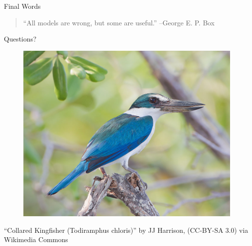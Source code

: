 \documentclass{beamer}
\begin{document}
\begin{frame}{Final Words}
\begin{quote}
``All models are wrong, but some are useful.'' --George E. P. Box
\end{quote}


\end{frame}




\begin{frame}{Questions? }
	\begin{figure}
		\centering
		\includegraphics[height=.80\textheight]{../images/kingfisher.jpg}
	\end{figure}
	\tiny
	\begin{center}\color{OSUdkbrn}
	``Collared Kingfisher (Todiramphus chloris)'' by JJ Harrison, (CC-BY-SA 3.0) via  Wikimedia Commons
	\end{center}

\end{frame}
\end{document}
